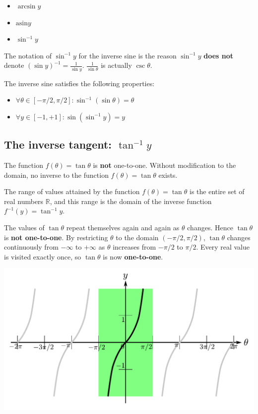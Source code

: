 \documentclass{article}
\begin{document}
\begin{itemize}
\item \(\arcsin y\)
\item \(\text{asin} y\)
\item \(\sin^{-1} y\) 
\end{itemize}

The notation of \(\sin^{-1} y\) for the inverse sine is the reason \(\sin^{-1} y\) {\bf does not} denote \((\sin y)^{-1} = \frac{1}{\sin y}\). \(\frac{1}{\sin\theta}\) is actually \(\csc\theta\).

The inverse sine satisfies the following properties:
\begin{itemize}
\item \(\forall \theta \in [-\pi/2, \pi/2] : \sin^{-1}(\sin\theta) = \theta\)
\item \(\forall y \in [-1, +1] : \sin(\sin^{-1}y) = y\)
\end{itemize}



\subsection{The inverse tangent: $\tan^{-1} y$}

The function \(f(\theta) = \tan\theta\) is {\bf not} one-to-one. Without modification to the domain, no inverse to the function \(f(\theta) = \tan\theta\) exists. 

The range of values attained by the function \(f(\theta) = \tan\theta\) is the entire set of real numbers \(\mathbb{R}\), and this range is the domain of the inverse function \(f^{-1}(y) = \tan^{-1} y\).

The values of \(\tan\theta\) repeat themselves again and again as \(\theta\) changes. Hence \(\tan\theta\) is {\bf not one-to-one}. By restricting \(\theta\) to the domain \((-\pi/2, \pi/2)\), \(\tan\theta\) changes continuously from \(-\infty\) to \(+\infty\) as \(\theta\) increases from \(-\pi/2\) to \(\pi/2\). Every real value is visited exactly once, so \(\tan\theta\) is now {\bf one-to-one}.  

\includegraphics[width = \textwidth]{making_tan_bijective}
\end{document}
